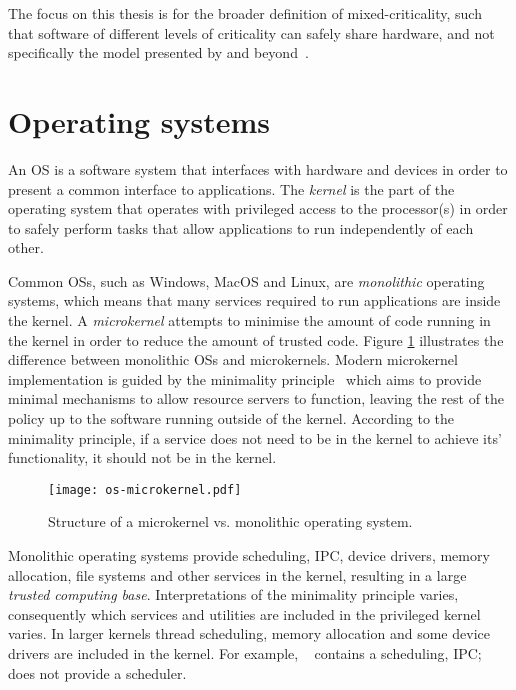 The focus on this thesis is for the broader definition of mixed-criticality, such that software of
different levels of criticality can safely share hardware, and not specifically the model
presented by \citet{Vestal_07} and beyond~\citep{Burns_Davis_17}.

\section{Operating systems}
\label{sec:background-operating-systems}

An \gls{OS} is a software system that interfaces with hardware and devices in order to present a
common interface to applications.  The \emph{kernel} is the part of the operating system that
operates with privileged access to the processor(s) in order to safely perform tasks that allow
applications to run independently of each other.

Common \glspl{OS}, such as Windows, MacOS and Linux, are \emph{monolithic} operating systems,
which means that many services required to run applications are inside the kernel.  A \emph{microkernel}
attempts to minimise the amount of code running in the kernel in order to reduce the amount of
trusted code.  Figure \ref{fig:os-microkernel} illustrates the difference between monolithic
\glspl{OS} and microkernels.  Modern microkernel implementation is guided by the minimality
principle~\citep{Liedtke_95} which aims to provide minimal mechanisms to allow resource servers to
function, leaving the rest of the policy up to the software running outside of the kernel. According
to the minimality principle, if a service does not need to be in the kernel to achieve its'
functionality, it should not be in the kernel.

\begin{figure}[tb]
	\begin{center}
		\leavevmode
		\texttt{[image: os-microkernel.pdf]}
		\caption{Structure of a microkernel vs. monolithic operating system.}
		\label{fig:os-microkernel}
	\end{center}
\end{figure}

Monolithic operating systems provide scheduling, \gls{IPC}, device drivers, memory allocation, file
systems and other services in the kernel, resulting in a large \emph{trusted computing base}.
Interpretations of the minimality principle varies, 
consequently which services and utilities are included in the privileged kernel varies. In
larger kernels thread scheduling, memory allocation and some device drivers are included in the kernel.
For example, \selfour~\citep{Klein_EHACDEEKNSTW_09} contains a scheduling, \gls{IPC}; 
\composite~\citep{Parmer:phd} does not provide a scheduler. 

